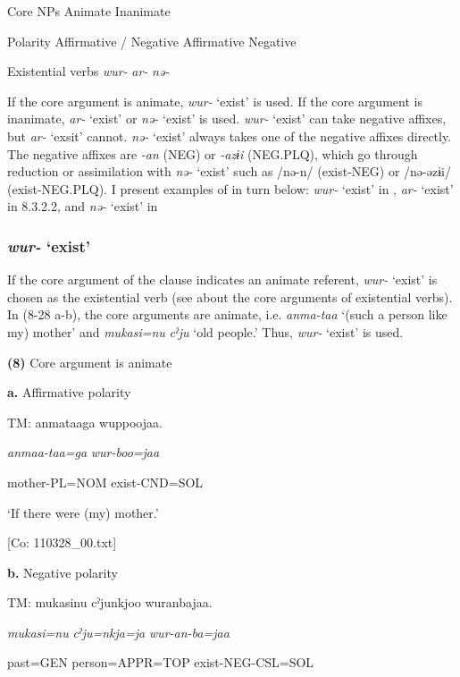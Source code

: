 Core NPs  Animate  Inanimate

Polarity  Affirmative / Negative  Affirmative  Negative

Existential verbs  \textit{wur-}  \textit{ar-}  \textit{nə-}

If the core argument is animate, \textit{wur-} ‘exist’ is used. If the core argument is inanimate, \textit{ar-} ‘exist’ or \textit{nə-} ‘exist’ is used. \textit{wur-} ‘exist’ can take negative affixes, but \textit{ar-} ‘exsit’ cannot. \textit{nə-} ‘exist’ always takes one of the negative affixes directly. The negative affixes are \textit{{}-an} (NEG) or \textit{{}-azɨi} (NEG.PLQ), which go through reduction or assimilation with \textit{nə-} ‘exist’ such as /nə-n/ (exist-NEG) or /nə-əzɨi/ (exist-NEG.PLQ). I present examples of  in turn below: \textit{wur-} ‘exist’ in , \textit{ar-} ‘exist’ in 8.3.2.2, and \textit{nə-} ‘exist’ in 

\subsubsection{\textit{wur-} ‘exist’}

If the core argument of the clause indicates an animate referent, \textit{wur-} ‘exist’ is chosen as the existential verb (see  about the core arguments of existential verbs). In (8-28 a-b), the core arguments are animate, i.e. \textit{anma-taa} ‘(such a person like my) mother’ and \textit{mukasi=nu} \textit{cˀju} ‘old people.’ Thus, \textit{wur-} ‘exist’ is used.

\textbf{(8)}  Core argument is animate

  \textbf{a.}  Affirmative polarity

    TM:  anmataaga  wuppoojaa.

      \textit{anmaa-taa=ga}  \textit{wur{}-boo=jaa}

      mother-PL=NOM  exist-CND=SOL

      ‘If there were (my) mother.’

      [Co: 110328\_00.txt]

  \textbf{b.}  Negative polarity

    TM:  mukasinu  cˀjunkjoo  wuranbajaa.

      \textit{mukasi=nu}  \textit{cˀju=nkja=ja}  \textit{wur{}-an-ba=jaa}

      past=GEN  person=APPR=TOP  exist-NEG-CSL=SOL

